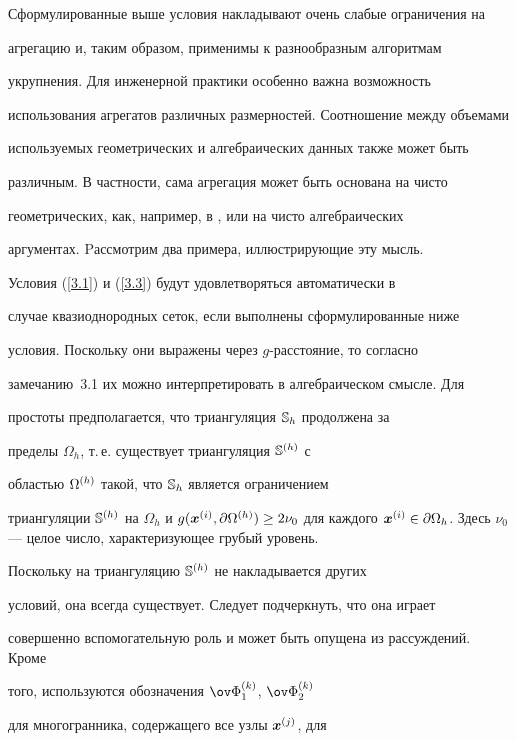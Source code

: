 Сформулированные выше условия накладывают очень слабые ограничения на


агрегацию и, таким образом, применимы к разнообразным алгоритмам


укрупнения. Для инженерной практики особенно важна возможность


использования агрегатов различных размерностей. Соотношение между объемами


используемых геометрических и алгебраических данных также может быть


различным. В частности, сама агрегация может быть основана на чисто


геометрических, как, например, в \cite {[29]}, или на чисто алгебраических


аргументах. Pассмотрим два примера, иллюстрирующие эту мысль.





Условия (\ref{3.1}) и (\ref{3.3}) будут удовлетворяться автоматически в


случае квазиоднородных сеток, если выполнены сформулированные ниже


условия. Поскольку они выражены через $g$-расстояние, то согласно


замечанию~3.1 их можно интерпретировать в алгебраическом смысле. Для


простоты предполагается, что триангуляция $\Bbb S_h$ продолжена за


пределы $\Omega_h$, т.\,е. существует триангуляция $\Bbb S^{(h)}$ с


областью $\Omega^{(h)}$ такой, что $\Bbb S_h$ является ограничением


триангуляции $\Bbb S\up h$ на $\Omega_h$ и $g(\bi x\up i,


\partial \Omega\up h)\ge 2\nu_0$ для каждого $\bi x\up i\in\partial


\Omega_h$. Здесь $\nu_0$ --- целое число, характеризующее грубый уровень.


Поскольку на триангуляцию $\Bbb S^{(h)}$ не накладывается других


условий, она всегда существует. Следует подчеркнуть, что она играет


совершенно вспомогательную роль и может быть опущена из рассуждений. Кроме


того, используются обозначения $\ov\Phi_1\up k$, $\ov\Phi_2\up k$


для многогранника, содержащего все узлы $\boldsymbol x^{(j)}$, для


